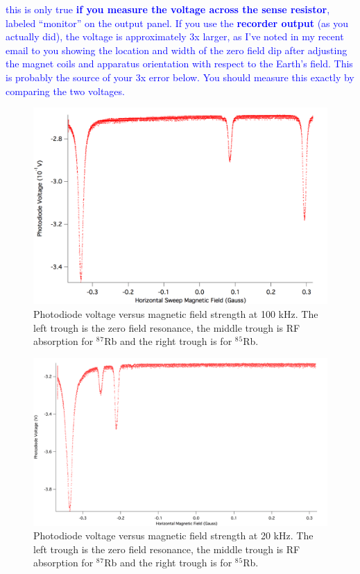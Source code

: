 \documentclass[prb,preprint]{revtex4-1}
\begin{document}
\textcolor{blue}{this is only true \textbf{if you measure the voltage across the sense resistor}, labeled ``monitor'' on the output panel. If you use the \textbf{recorder output} (as you actually did), the voltage is approximately 3x larger, as I've noted in my recent email to you showing the location and width of the zero field dip after adjusting the magnet coils and apparatus orientation with respect to the Earth's field. This is probably the source of your 3x error below. You should measure this exactly by comparing the two voltages.}  \\

\begin{figure}[h]
\centering
\includegraphics[width=16cm]{100kHz.png}
\caption{Photodiode voltage versus magnetic field strength at 100 kHz. The left trough is the zero field resonance, the middle trough is RF absorption for $^8$$^7$Rb and the right trough is for $^8$$^5$Rb.}
\label{100kHz}
\end{figure}


\begin{figure}[h]
\centering
\includegraphics[width=16cm]{20kHz.png}
\caption{Photodiode voltage versus magnetic field strength at 20 kHz. The left trough is the zero field resonance, the middle trough is RF absorption for $^8$$^7$Rb and the right trough is for $^8$$^5$Rb.}
\label{20kHz}
\end{figure}
\end{document}
